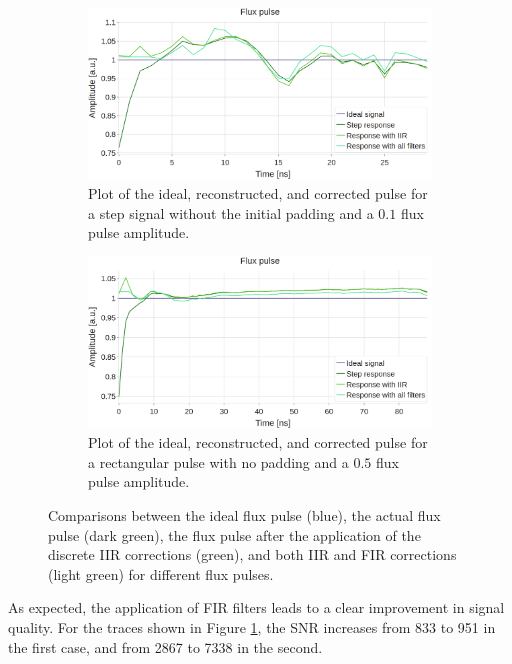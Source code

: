 \begin{figure}[h!]
    \centering
    \begin{subfigure}[t]{0.495\textwidth}
        \includegraphics[width=\textwidth]{figures/png/Cryoscope/step_nice.png}
        \caption{Plot of the ideal, reconstructed, and corrected pulse for a step signal without the initial padding and a $0.1$ flux pulse amplitude.}
        \label{fig:nice:nopad}
    \end{subfigure}
    \hfill
    \begin{subfigure}[t]{0.495\textwidth}
        \includegraphics[width=\textwidth]{figures/png/Cryoscope/long_nice.png}
        \caption{Plot of the ideal, reconstructed, and corrected pulse for a rectangular pulse with no padding and a $0.5$ flux pulse amplitude.}
        \label{fig:nice:long}
    \end{subfigure}
    \caption{Comparisons between the ideal flux pulse (blue), the actual flux pulse (dark green), the flux pulse after the application of the discrete IIR corrections (green), and both IIR and FIR corrections (light green) for different flux pulses.}
    \label{fig:nice}
\end{figure}

As expected, the application of FIR filters leads to a clear improvement in signal quality. 
For the traces shown in Figure \ref{fig:nice:nopad}, the SNR increases from 833 to 951 in the first case, and from 2867 to 7338 in the second.

